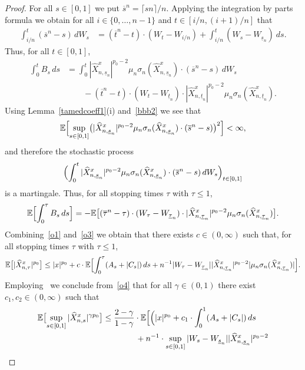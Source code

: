 \documentclass[11pt]{amsart}
\newcommand{\EE}{{\mathbb E}}
\newcommand{\usn}{\underline {s}_n}
\newcommand{\utn}{\underline {t}_n}
\newcommand{\upsn}{\overline {s}^n}
\newcommand{\uptn}{\overline {t}^n}
\theoremstyle{plain}
\theoremstyle{definition}
\begin{document}
\begin{proof}
For all $s\in[0,1]$ we put $\upsn = \lceil s n \rceil /n$.
Applying the integration by parts formula we obtain for all $i\in\{0, \ldots, n-1\}$ and  $t\in[i/n,(i+1)/n]$ that
\begin{align*}
\int_{i/n}^t (\upsn-s)\, dW_s
&=(\uptn-t)\cdot (W_t- W_{i/n})+\int_{i/n}^t (W_s-W_{\usn})\ ds.
\end{align*}
Thus, for all $t\in[0,1]$,
\begin{align*}
\int_0^t B_s\, ds  & = \int_0^t |\widehat X^x_{n,\usn}|^{p_0-2} \mu_n\sigma_n(\widehat X^x_{n,\usn})\cdot (\upsn-s)\, dW_s \\
& \qquad - (\uptn-t)\cdot (W_t-W_{\utn})\cdot |\widehat X^x_{n,\utn}|^{p_0-2} \mu_n\sigma_n(\widehat X^x_{n,\utn}).
\end{align*}
Using  Lemma~\ref{tamedcoeff1}(i) and~\eqref{bbb2} we see that
\[
\EE\Bigl[\sup_{s\in[0,1]}\bigl(|\widehat X^x_{n,\usn}|^{p_0-2} \mu_n\sigma_n(\widehat X^x_{n,\usn})\cdot (\upsn-s)\bigr)^2\Bigr] < \infty,
\]
and therefore the stochastic process
\[
\Bigl(\int_0^t |\widehat X^x_{n,\usn}|^{p_0-2} \mu_n\sigma_n(\widehat X^x_{n,\usn})\cdot (\upsn-s)\, dW_s\Bigr)_{t\in[0,1]}
\]
is a martingale. Thus, for all stopping times $\tau$ with $\tau \le 1$,
\begin{equation}\label{o3}
\EE\Bigl[\int_0^\tau B_s\, ds\Bigr] = -\EE\bigl[ (\overline\tau^n-\tau)\cdot (W_{\tau}-W_{\underline\tau_n})\cdot |\widehat X^x_{n,\underline \tau_n}|^{p_0-2} \mu_n\sigma_n(\widehat X^x_{n,\underline \tau_n})\bigr].
\end{equation}
Combining~\eqref{o1} and~\eqref{o3} we obtain that there exists $c\in(0, \infty)$ such that, for all stopping times $\tau$ with $\tau \le 1$,
\begin{equation}\label{o4}
 \EE\bigl[|\widehat X^x_{n,\tau}|^{p_0}\bigr]\le |x|^{p_0}+ c\cdot \EE\Bigl[\int_0^\tau (A_s + |C_s|)\, ds
 + n^{-1}|W_{\tau}-W_{\underline\tau_n}||\widehat X^x_{n,\underline \tau_n}|^{p_0-2} |\mu_n\sigma_n(\widehat X^x_{n,\underline \tau_n})| \Bigr].
\end{equation}
Employing~\cite[Lemma 3.2]{gk03b} we conclude from~\eqref{o4} that
for all $\gamma\in (0,1)$ there exist $c_1, c_2\in(0, \infty)$  such that
\begin{equation}\label{o5}
\begin{aligned}
\EE\bigl[\sup_{s\in[0,1]}|\widehat X^x_{n,s}|^{\gamma p_0}\bigr]
& \le \frac{2-\gamma}{1-\gamma} \cdot \EE\Bigl[\Bigl(|x|^{p_0} +c_1\cdot \int_0^1( A_s + |C_s|)\, ds \\
 &\qquad\qquad +                       n^{-1} \cdot \sup_{s\in[0,1]} |W_{s}-W_{\usn}||\widehat X^x_{n,\usn}|^{p_0-2}

\end{aligned}
\end{equation}
\end{proof}
\end{document}
